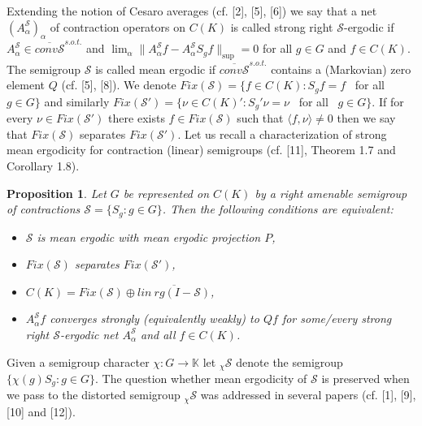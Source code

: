 \documentclass{amsart}
\newtheorem{prop}[thm]{Proposition}
\theoremstyle{definition}
\theoremstyle{remark}
\numberwithin{equation}{section}
\begin{document}
Extending the notion of Cesaro averages (cf. [2], [5], [6]) we say that a net $(A_{\alpha }^{\mathcal{S}})_{\alpha }$ of contraction operators on $C(K)$ is called strong right $\mathcal{S}$-ergodic if $A_{\alpha}^{\mathcal{S}} \in \overline{conv\mathcal{S}}^{s.o.t.}$ and $\lim_{\alpha} \| A_{\alpha}^{\mathcal{S}}f -  A_{\alpha}^{\mathcal{S}}S_gf \|_{\sup} = 0$ for all $g\in G$ and $f\in C(K)$. The semigroup $\mathcal{S}$ is called mean ergodic if $\overline{conv \mathcal{S}}^{s.o.t.}$ contains a (Markovian) zero element $Q$ (cf. [5], [8]). We denote $Fix(\mathcal{S}) = \{ f\in C(K) : S_gf = f  $ \ for all \ $g\in G \}$ and similarly $Fix(\mathcal{S}') = \{ \nu\in C(K)' : S_g'\nu  = \nu  $ \ for all \ $g\in G \}$. If for every $\nu \in Fix(\mathcal{S}')$ there exists $f\in Fix(\mathcal{S})$ such that $\langle f , \nu \rangle \neq 0 $ then we say that $Fix(\mathcal{S})$ separates $Fix(\mathcal{S}')$. Let us recall a characterization of strong mean ergodicity for contraction (linear) semigroups (cf. [11], Theorem 1.7 and Corollary 1.8).

\begin{prop}
Let $G$ be represented on $C(K)$ by a right amenable semigroup of contractions $\mathcal{S} = \{ S_g : g \in G \}$. Then the following conditions are equivalent:
\begin{itemize}
\item[(1)] $\mathcal{S}$ is mean ergodic with mean ergodic projection $P$,
\item[(2)] $Fix(\mathcal{S})$ separates $Fix(\mathcal{S}')$,
\item[(3)] $C(K) = Fix(\mathcal{S})\oplus \overline{lin\ rg(I - \mathcal{S})} $,
\item[(4)] $A_{\alpha}^{\mathcal{S}}f$ converges strongly (equivalently weakly) to $Qf$ for some/every strong right $\mathcal{S}$-ergodic net $A_{\alpha}^{\mathcal{S}}$ and all $f\in C(K)$.
\end{itemize}
\end{prop}

Given a semigroup character $\chi : G \to \mathbb{K} $ let $_{\chi}\mathcal{S}$ denote the semigroup $\{ \chi(g)S_g : g\in G\}$. The question whether mean ergodicity of $\mathcal{S}$ is preserved when we pass to the distorted semigroup $_{\chi}\mathcal{S}$ was addressed in several papers (cf. [1], [9], [10] and [12]).
\end{document}

